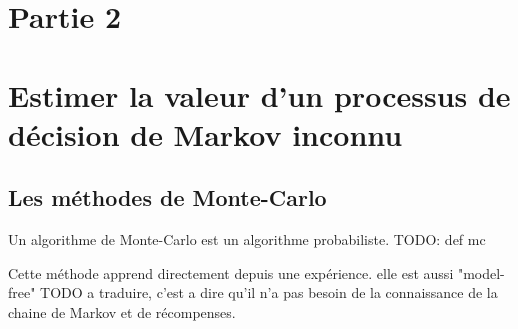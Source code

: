 \documentclass[a4paper,10pt]{article}
\begin{document}
\section{Partie 2}

\section{Estimer la valeur d'un processus de décision de Markov inconnu}

\subsection{Les méthodes de Monte-Carlo}
	
Un algorithme de Monte-Carlo est un algorithme probabiliste. TODO:  def mc

Cette méthode apprend directement depuis une expérience. elle est aussi "model-free" TODO a traduire, c'est a dire qu'il n'a pas besoin de la connaissance de la chaine de Markov et de récompenses.
	
\end{document}
